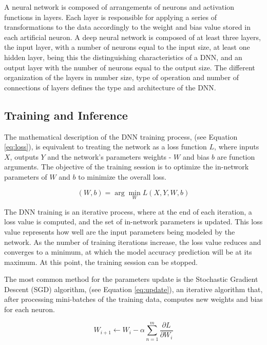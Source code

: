 A neural network is composed of arrangements of neurons and activation functions in layers. Each layer is responsible for applying a series of transformations to the data accordingly to the weight and bias value stored in each artificial neuron. A deep neural network is composed of at least three layers, the input layer, with a number of neurons equal to the input size, at least one hidden layer, being this the distinguishing characteristics of a DNN, and an output layer with the number of neurons equal to the output size. The different organization of the layers in number size, type of operation and number of connections of layers defines the type and architecture of the DNN.

\subsection{Training and Inference}
The mathematical description of the DNN training process, (see Equation \ref{eq:loss}), is equivalent to treating the network as a loss function $L$, where inputs $X$, outputs $Y$ and the network's parameters weights - $W$ and bias $b$ are function arguments. The objective of the training session is to optimize the in-network parameters of $W$ and $b$ to minimize the overall loss.

\begin{equation}
    \label{eq:loss}
    (W,b) = \arg\min_{W} L(X,Y,W,b)
\end{equation}

The DNN training is an iterative process, where at the end of each iteration, a loss value is computed, and the set of in-network parameters is updated. This loss value represents how well are the input parameters being modeled by the network. As the number of training iterations increase, the loss value reduces and converges to a minimum, at which the model accuracy prediction will be at its maximum. At this point, the training session can be stopped.

The most common method for the parameters update is the Stochastic Gradient Descent (SGD) algorithm, (see Equation \ref{eq:update}), an iterative algorithm that, after processing mini-batches of the training data, computes new weights and bias for each neuron. 

\begin{equation}
    \label{eq:update}
    W_{i+1} \xleftarrow{} W_i - \alpha \sum_{n=1}^{m}\frac{\partial L}{\partial W_i}
\end{equation}

